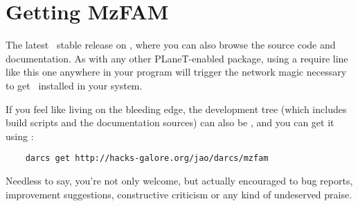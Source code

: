 \section{Getting MzFAM}
\label{sec:getting-mzfam}

The latest \MzFam\ stable release
 on ,
where you can also browse the source code and documentation. As with
any other PLaneT-enabled package, using a require line like this one
anywhere in your program will trigger the network magic necessary
to get \MzFam\ installed in your system.

If you feel like living on the bleeding edge, the development tree
(which includes build scripts and the documentation sources) can also
be , and
you can get it using :
\begin{verbatim}
    darcs get http://hacks-galore.org/jao/darcs/mzfam
\end{verbatim}

Needless to say, you're not only welcome, but actually encouraged to
 bug reports, improvement
suggestions, constructive criticism or any kind of undeserved praise.


